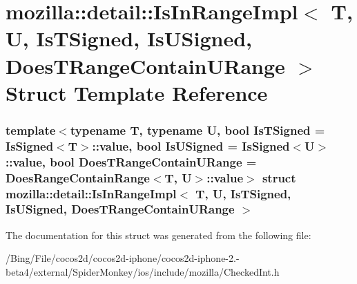 \hypertarget{structmozilla_1_1detail_1_1_is_in_range_impl}{\section{mozilla\-:\-:detail\-:\-:Is\-In\-Range\-Impl$<$ T, U, Is\-T\-Signed, Is\-U\-Signed, Does\-T\-Range\-Contain\-U\-Range $>$ Struct Template Reference}
\label{structmozilla_1_1detail_1_1_is_in_range_impl}
}
\subsubsection*{template$<$typename T, typename U, bool Is\-T\-Signed = Is\-Signed$<$\-T$>$\-::value, bool Is\-U\-Signed = Is\-Signed$<$\-U$>$\-::value, bool Does\-T\-Range\-Contain\-U\-Range = Does\-Range\-Contain\-Range$<$\-T, U$>$\-::value$>$ struct mozilla\-::detail\-::\-Is\-In\-Range\-Impl$<$ T, U, Is\-T\-Signed, Is\-U\-Signed, Does\-T\-Range\-Contain\-U\-Range $>$}



The documentation for this struct was generated from the following file\-:\begin{DoxyCompactItemize}
\item 
/\-Bing/\-File/cocos2d/cocos2d-\/iphone/cocos2d-\/iphone-\/2.-\/beta4/external/\-Spider\-Monkey/ios/include/mozilla/Checked\-Int.\-h\end{DoxyCompactItemize}
